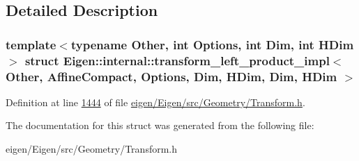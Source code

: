 \subsection{Detailed Description}
\subsubsection*{template$<$typename Other, int Options, int Dim, int H\+Dim$>$\newline
struct Eigen\+::internal\+::transform\+\_\+left\+\_\+product\+\_\+impl$<$ Other, Affine\+Compact, Options, Dim, H\+Dim, Dim, H\+Dim $>$}



Definition at line \hyperlink{eigen_2_eigen_2src_2_geometry_2_transform_8h_source_l01444}{1444} of file \hyperlink{eigen_2_eigen_2src_2_geometry_2_transform_8h_source}{eigen/\+Eigen/src/\+Geometry/\+Transform.\+h}.



The documentation for this struct was generated from the following file\+:\begin{DoxyCompactItemize}
\item 
eigen/\+Eigen/src/\+Geometry/\+Transform.\+h\end{DoxyCompactItemize}
